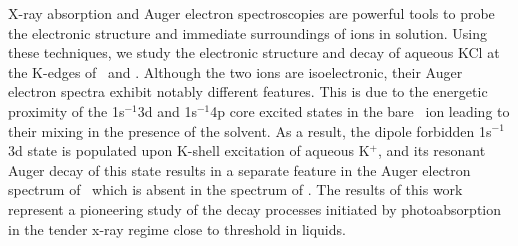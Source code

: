 X-ray absorption and Auger electron spectroscopies are powerful tools to probe the electronic structure and immediate surroundings of ions in solution. Using these techniques, we study the electronic structure and decay of aqueous KCl at the K-edges of \ki~and \cli. Although the two ions are isoelectronic, their Auger electron spectra exhibit notably different features. This is due to the energetic proximity of the 1s$^{-1}$3d and 1s$^{-1}$4p core excited states in the bare \ki~ion leading to their mixing in the presence of the solvent. As a result, the dipole forbidden 1s$^{-1}$3d state is populated upon K-shell excitation of aqueous K$^{+}$, and its resonant Auger decay of this state results in a separate feature in the Auger electron spectrum of \ki~which is absent in the spectrum of \cli. The results of this work represent a pioneering study of the decay processes initiated by photoabsorption in the tender x-ray regime close to threshold in liquids.



